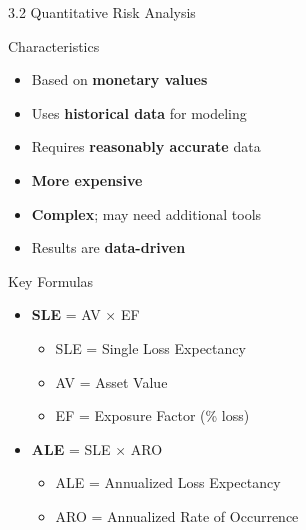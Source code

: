 \documentclass[9pt]{beamer}  %
\begin{document}
	\begin{frame}{3.2 Quantitative Risk Analysis}
		\begin{block}{Characteristics}
			\begin{itemize}
				\item Based on \textbf{monetary values}
				\item Uses \textbf{historical data} for modeling
				\item Requires \textbf{reasonably accurate} data
				\item \textbf{More expensive}
				\item \textbf{Complex}; may need additional tools
				\item Results are \textbf{data-driven}
			\end{itemize}
		\end{block}
		
		\begin{block}{Key Formulas}
			\begin{itemize}
				\item \textbf{SLE} = AV × EF
				\begin{itemize}
					\item SLE = Single Loss Expectancy
					\item AV = Asset Value
					\item EF = Exposure Factor (\% loss)
				\end{itemize}
				\item \textbf{ALE} = SLE × ARO
				\begin{itemize}
					\item ALE = Annualized Loss Expectancy
					\item ARO = Annualized Rate of Occurrence
				\end{itemize}
			\end{itemize}
		\end{block}
	\end{frame}
	
\end{document}
